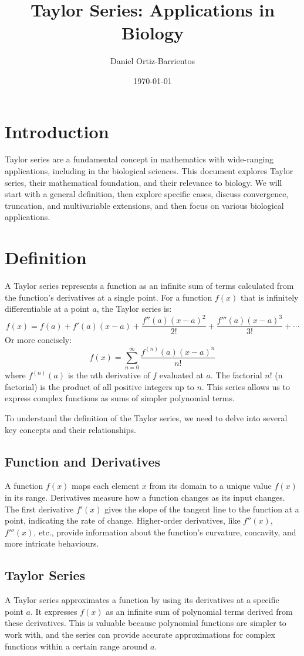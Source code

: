 \documentclass{article}
\title{Taylor Series: Applications in Biology}
\author{Daniel Ortiz-Barrientos}
\date{\today}
\begin{document}
\maketitle

\section{Introduction}
Taylor series are a fundamental concept in mathematics with wide-ranging applications, including in the biological sciences. This document explores Taylor series, their mathematical foundation, and their relevance to biology. We will start with a general definition, then explore specific cases, discuss convergence, truncation, and multivariable extensions, and then focus on various biological applications.

\section{Definition}
A Taylor series represents a function as an infinite sum of terms calculated from the function's derivatives at a single point. For a function \(f(x)\) that is infinitely differentiable at a point \(a\), the Taylor series is:
\[
f(x) = f(a) + f'(a)(x-a) + \frac{f''(a)(x-a)^2}{2!} + \frac{f'''(a)(x-a)^3}{3!} + \cdots
\]
Or more concisely:
\[
f(x) = \sum_{n=0}^{\infty} \frac{f^{(n)}(a)(x-a)^n}{n!}
\]
where \(f^{(n)}(a)\) is the \(n\)th derivative of \(f\) evaluated at \(a\). The factorial \(n!\) (n factorial) is the product of all positive integers up to \(n\). This series allows us to express complex functions as sums of simpler polynomial terms.

To understand the definition of the Taylor series, we need to delve into several key concepts and their relationships.

\subsection{Function and Derivatives}
A function \( f(x) \) maps each element \( x \) from its domain to a unique value \( f(x) \) in its range. Derivatives measure how a function changes as its input changes. The first derivative \( f'(x) \) gives the slope of the tangent line to the function at a point, indicating the rate of change. Higher-order derivatives, like \( f''(x) \), \( f'''(x) \), etc., provide information about the function's curvature, concavity, and more intricate behaviours.

\subsection{Taylor Series}
A Taylor series approximates a function by using its derivatives at a specific point \( a \). It expresses \( f(x) \) as an infinite sum of polynomial terms derived from these derivatives. This is valuable because polynomial functions are simpler to work with, and the series can provide accurate approximations for complex functions within a certain range around \( a \).
\end{document}

